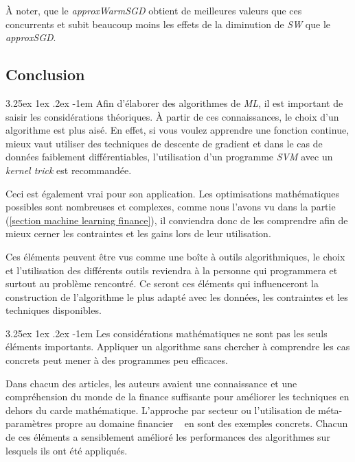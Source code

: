 \documentclass[a4paper, 11pt]{article}
\makeatletter
\renewcommand\paragraph{\@startsection{paragraph}{5}{\z@}%
  {3.25ex \@plus1ex \@minus.2ex}%
  {-1em}%
  {\normalfont\normalsize\bfseries}}
\makeatother
\begin{document}
À noter, que le \textit{approxWarmSGD} obtient de meilleures valeurs que ces concurrents et subit beaucoup moins
les effets de la diminution de \textit{SW} que le \textit{approxSGD}.

\subsection{Conclusion}
\paragraph{}
Afin d'élaborer des algorithmes de \textit{ML}, il est important de saisir les considérations théoriques.
À partir de ces connaissances, le choix d'un algorithme est plus aisé. En effet, si vous voulez apprendre une fonction
continue, mieux vaut utiliser des techniques de descente de gradient et dans le cas de données faiblement différentiables, 
l'utilisation d'un programme \textit{SVM} avec un \textit{kernel trick} est recommandée.

Ceci est également vrai pour son application. Les optimisations mathématiques possibles sont nombreuses et complexes,
comme nous l'avons vu dans la partie (\ref{section machine learning finance}), il conviendra donc de les comprendre afin de
mieux cerner les contraintes et les gains lors de leur utilisation.

Ces éléments peuvent être vus comme une boîte à outils algorithmiques, le choix et l'utilisation des différents
outils reviendra à la personne qui programmera et surtout au problème rencontré. Ce seront ces éléments qui influenceront la construction de l'algorithme le plus
adapté avec les données, les contraintes et les techniques disponibles.

\paragraph{}
Les considérations mathématiques ne sont pas les seuls éléments importants. Appliquer un algorithme sans chercher à comprendre
les cas concrets peut mener à des programmes peu efficaces.

Dans chacun des articles, les auteurs avaient une connaissance et une compréhension du monde de la finance suffisante 
pour améliorer les techniques en dehors du carde mathématique. L'approche par secteur \cite{machine_learning_automated_trading}
ou l'utilisation de méta-paramètres propre au domaine financier ~\cite{fx_trading} en sont des exemples concrets.
Chacun de ces éléments a sensiblement amélioré les performances des algorithmes sur lesquels ils ont été appliqués.
\end{document}

